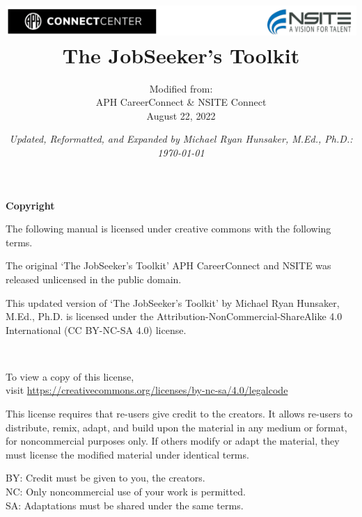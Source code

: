 \documentclass[11pt, letterpaper, twoside]{book}
\title{\vspace{-5cm}\includegraphics[width=1\linewidth]{branding.png} \\ \vspace{5cm}\Huge The JobSeeker's Toolkit}
\author{Modified from:\\ APH CareerConnect \& NSITE Connect\\August 22, 2022}
\date{\vfill \textit{Updated, Reformatted, and Expanded by Michael Ryan Hunsaker, M.Ed., Ph.D.: \\ {\today}}}
\begin{document}
\raggedbottom
\raggedright
{}
\maketitle
\clearpage

\mbox{}

\vfill

	\textbf{Copyright}
	\bigskip
		
	The following manual is licensed under creative commons with the following terms.
		
	\bigskip
		
	The original `The JobSeeker's Toolkit' APH CareerConnect and NSITE was released unlicensed in the public domain. 
 
    This updated version of `The JobSeeker's Toolkit' by Michael Ryan Hunsaker, M.Ed., Ph.D. is licensed under the Attribution-NonCommercial-ShareAlike 4.0 International (CC BY-NC-SA 4.0) license.
		
	\bigskip
		
	\ccbyncsa\
		
	\bigskip
		
	To view a copy of this license, \\
	visit \href{https://creativecommons.org/licenses/by-nc-sa/4.0/legalcode}{https://creativecommons.org/licenses/by-nc-sa/4.0/legalcode}
		
	\bigskip
		
	This license requires that re-users give credit to the creators. It allows re-users to distribute, remix, adapt, and build upon the material in any medium or format, for noncommercial purposes only. If others modify or adapt the material, they must license the modified material under identical terms.
		
	\bigskip
		
	BY: Credit must be given to you, the creators. \\
	NC: Only noncommercial use of your work is permitted. \\
	SA: Adaptations must be shared under the same terms.

\makeatother
\clearpage 
{}

\setcounter{tocdepth}{1}
\fancyhead{}
\fancyfoot{}
\tableofcontents
\clearpage
\fancyhead{}
\fancyfoot{}
\pagestyle{fancyplain}
\fancyfoot[C]{\thepage}

\fancyhead[L]{\textit{\lastxmark}}
\fancyhead[R]{\textit{\firstxmark}}
\end{document}
